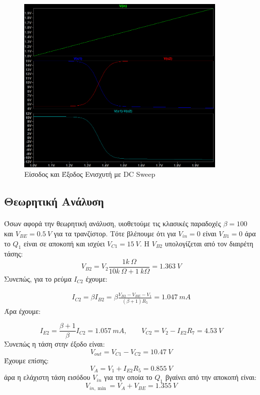 \documentclass[11pt,a4paper,twoside,onecolumn,openright,final]{memoir}
\begin{document}
\begin{figure}[h]
\centerfloat%
\includegraphics[width=10.0cm]{figures/exercise1plot2.png}
\caption{Είσοδος και Έξοδος Ενισχυτή με DC Sweep}\label{fig:ex1plot2}
\end{figure}

\subsection{Θεωρητική Ανάλυση}

\paragraph*{}

Όσων αφορά την θεωρητική ανάλυση, υιοθετούμε τις κλασικές παραδοχές \(\beta = 100\) και \(V_{BE} = 0.5 \ V\) για τα τρανζίστορ. Τότε βλέπουμε ότι για \(V_{in} = 0\) είναι \(V_{B1} = 0\) άρα το \(Q_1\) είναι σε αποκοπή και ισχύει \(V_{C1} = 15\ V\). Η \(V_{B2}\) υπολογίζεται από τον διαιρέτη τάσης:
\[
V_{B2} = V_2\frac{1k\ \Omega}{10k \ \Omega + 1 \ k\Omega} = 1.363\ V
\]
Συνεπώς, για το ρεύμα \(I_{C2}\) έχουμε:

\begin{gather*}
    I_{C2} = \beta I_{B2} = \beta \frac{V_{B2} - V_{BE} - V_1}{(\beta+1)R_5} = 1.047 \ mA
\end{gather*}
Άρα έχουμε:

\[
I_{E2} = \frac{\beta+1}{\beta}I_{C2} = 1.057 \ mA, \quad\quad V_{C2} = V_2 - I_{E2}R_7 = 4.53\ V
\]
Συνεπώς η τάση στην έξοδο είναι:
\[
V_{out} = V_{C1} - V_{C2} = 10.47 \ V
\]
Έχουμε επίσης:
\[
V_A = V_1 + I_{E2}R_5 = 0.855\ V
\]
άρα η ελάχιστη τάση εισόδου \(V_{in}\) για την οποία το \(Q_1\) βγαίνει από την αποκοπή είναι:
\[
V_{in,\min} = V_A + V_{BE} = 1.355 \ V
\]
\end{document}
